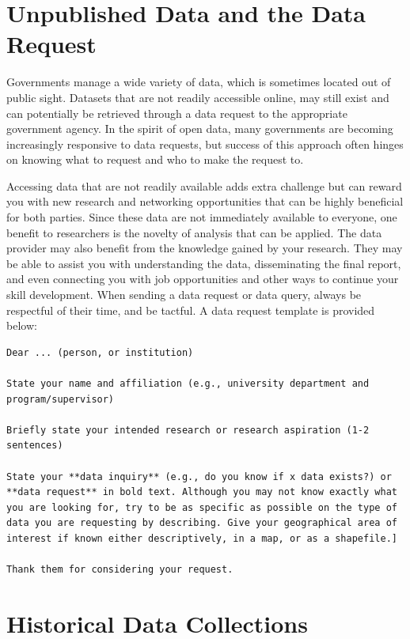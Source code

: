 \documentclass[
]{book}
\begin{document}
\section{Unpublished Data and the Data Request}\label{unpublished-data-and-the-data-request}

Governments manage a wide variety of data, which is sometimes located out of public sight. Datasets that are not readily accessible online, may still exist and can potentially be retrieved through a data request to the appropriate government agency. In the spirit of open data, many governments are becoming increasingly responsive to data requests, but success of this approach often hinges on knowing what to request and who to make the request to.

Accessing data that are not readily available adds extra challenge but can reward you with new research and networking opportunities that can be highly beneficial for both parties. Since these data are not immediately available to everyone, one benefit to researchers is the novelty of analysis that can be applied. The data provider may also benefit from the knowledge gained by your research. They may be able to assist you with understanding the data, disseminating the final report, and even connecting you with job opportunities and other ways to continue your skill development. When sending a data request or data query, always be respectful of their time, and be tactful. A data request template is provided below:

\begin{verbatim}
Dear ... (person, or institution)

State your name and affiliation (e.g., university department and program/supervisor)

Briefly state your intended research or research aspiration (1-2 sentences)

State your **data inquiry** (e.g., do you know if x data exists?) or **data request** in bold text. Although you may not know exactly what you are looking for, try to be as specific as possible on the type of data you are requesting by describing. Give your geographical area of interest if known either descriptively, in a map, or as a shapefile.]

Thank them for considering your request. 
\end{verbatim}

\section{Historical Data Collections}\label{historical-data-collections}
\end{document}
